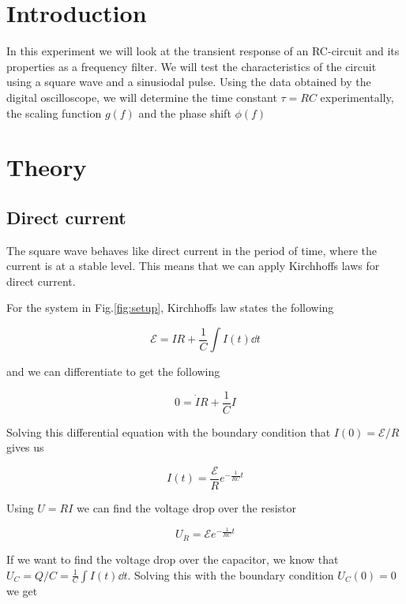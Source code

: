 \documentclass[../main/main.tex]{subfiles}
\begin{document}
\section*{Introduction}

In this experiment we will look at the transient response of an RC-circuit and its properties as a frequency filter.
We will test the characteristics of the circuit using a square wave and a sinusiodal pulse.
Using the data obtained by the digital oscilloscope, we will determine the time constant \( \tau = RC \) experimentally, the scaling function \( g(f) \) and the phase shift \( \phi(f) \)

\section*{Theory}

\subsection*{Direct current}

The square wave behaves like direct current in the period of time, where the current is at a stable level.
This means that we can apply Kirchhoffs laws for direct current.

For the system in Fig.\ref{fig:setup}, Kirchhoffs law states the following

\begin{equation}
  \mathcal{E} = IR+\frac{1}{C} \int I(t) \dd t
\end{equation}

and we can differentiate to get the following

\begin{equation}
  0 = \dot{I} R + \frac{1}{C} I
\end{equation}

Solving this differential equation with the boundary condition that \( I(0) = \mathcal{E} / R \) gives us

\begin{equation}
  I(t) = \frac{\mathcal{E}}{R} e^{-\frac{1}{RC} t}
\end{equation}

Using \( U = RI \) we can find the voltage drop over the resistor

\begin{equation}
  U_R = \mathcal{E} e^{-\frac{1}{RC} t}
\end{equation}

If we want to find the voltage drop over the capacitor, we know that \( U_C = Q / C = \frac{1}{C} \int I(t) \dd t \).
Solving this with the boundary condition \( U_C(0) = 0 \) we get
\end{document}
